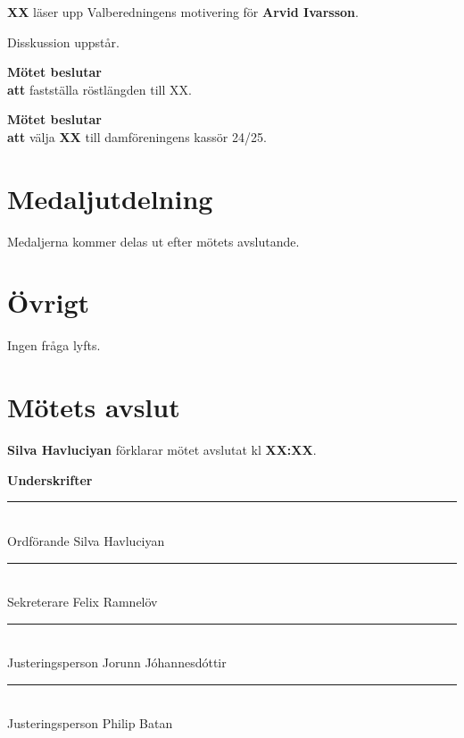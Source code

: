 \documentclass{datateknologsektionen-document}
\newcommand{\ind}{\hspace*{2em}}
\newcommand{\motetbeslutar}{\textbf{Mötet beslutar}}
\newcommand{\att}{\\\ind\textbf{att}}
\begin{document}
\textbf{XX} läser upp Valberedningens motivering för \textbf{Arvid Ivarsson}.

Disskussion uppstår.

\motetbeslutar
\att{} fastställa röstlängden till XX.

\motetbeslutar
\att{} välja \textbf{XX} till damföreningens kassör 24/25.

\pagebreak

\section{Medaljutdelning}
Medaljerna kommer delas ut efter mötets avslutande.

\section{Övrigt}

Ingen fråga lyfts.


\section{Mötets avslut}


\textbf{Silva Havluciyan} förklarar mötet avslutat kl \textbf{XX:XX}.




\pagebreak
{\Large\bfseries Underskrifter}

\vspace*{1.2cm}
\noindent\rule{8cm}{1pt}\\
Ordförande Silva Havluciyan

\vspace*{1.2cm}
\noindent\rule{8cm}{1pt}\\
Sekreterare Felix Ramnelöv

\vspace*{1.2cm}
\noindent\rule{8cm}{1pt}\\
Justeringsperson Jorunn Jóhannesdóttir

\vspace*{1.2cm}
\noindent\rule{8cm}{1pt}\\
Justeringsperson Philip Batan
\end{document}
